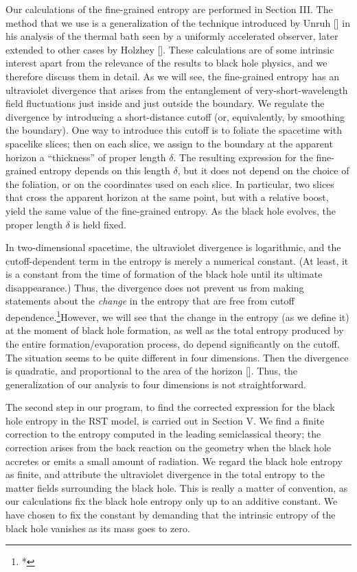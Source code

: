 Our calculations of the fine-grained entropy are performed in Section III. The
method that we use is a generalization of the technique introduced by Unruh
[\cite{unruh}] in his analysis of the thermal bath seen by a uniformly
accelerated observer, later extended to other cases by Holzhey
[\cite{holzhey}].  These calculations are of some intrinsic interest apart from
the relevance of the results to black hole physics, and we therefore discuss
them in detail.  As we will see, the
fine-grained entropy has an ultraviolet divergence that arises from the
entanglement of very-short-wavelength field fluctuations just inside and just
outside the boundary.  We regulate the divergence by introducing a
short-distance cutoff (or, equivalently, by smoothing the boundary). One way to
introduce this cutoff is to foliate the spacetime with spacelike slices; then
on each slice, we assign to the boundary at the apparent horizon a
``thickness'' of proper length $\delta$.   The resulting expression for the
fine-grained entropy depends on this length $\delta$, but it does not depend on
the choice of the foliation, or on the coordinates used on each slice.  In
particular, two slices that cross the apparent horizon at the same point, but
with a relative boost, yield the same value of the fine-grained entropy.  As
the
black hole evolves, the proper length $\delta$ is held fixed.

In two-dimensional spacetime, the ultraviolet divergence is logarithmic, and
the cutoff-dependent term in the entropy is merely a numerical constant.  (At
least, it is a constant from the time of formation of the black hole until its
ultimate disappearance.)
Thus, the divergence does not prevent us from making
statements about the {\it change} in the entropy that are free from cutoff
dependence.\footnote{*}{However, we will see that the change in the
entropy (as we define it)
at the moment of black hole formation, as well as the total
entropy produced by the entire formation/evaporation process, do
depend significantly on the cutoff.}  The situation seems to be quite different
in four
dimensions.
Then the divergence is quadratic, and proportional to the area of the horizon
[\cite{hooft2}].  Thus, the generalization of our analysis to four dimensions
is not straightforward.

The second step in our program, to find the corrected expression for the black
hole entropy in the RST model, is carried out in Section V.  We find a finite
correction to the entropy computed in the leading semiclassical theory;  the
correction arises from the back reaction on the geometry when the black hole
accretes or emits a small amount of radiation.  We regard the black hole
entropy as finite, and attribute the ultraviolet divergence in the total
entropy to the matter fields surrounding the black hole.  This is really a
matter of convention, as our calculations fix the black hole entropy only up to
an additive constant.  We have chosen to fix the constant by demanding that the
intrinsic entropy of the black hole vanishes as its mass goes to zero.

